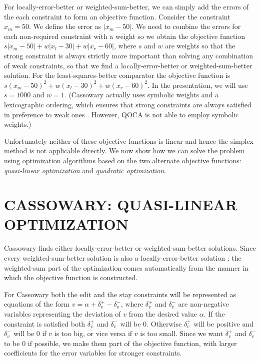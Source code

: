 \documentclass{uist96}
\begin{document}
For locally-error-better or weighted-sum-better, we can
simply add the errors of the each constraint to form an objective function.
Consider the constraint $x_m = 50$.  We define the error as $|x_m-50|$\@.  We
need to combine the errors for each non-required constraint with a weight
so we obtain the objective function 
\mbox{$s |x_m - 50| + w |x_l - 30| + w |x_r - 60|$}, where 
$s$ and $w$ are weights so that the strong constraint is always
strictly more important than solving any combination of weak constraints,
so that we find a locally-error-better or weighted-sum-better solution.
For the least-squares-better comparator the objective function is 
$s (x_m - 50)^2 + w (x_l - 30)^2 + w (x_r - 60)^2$\@.  
In the presentation, we will use $s = 1000$ and $w = 1$.
(Cassowary actually uses symbolic weights
and a lexicographic ordering, which ensures that
strong constraints are always satisfied in preference to weak 
ones \cite{borning-simplex-tr}.  However,
QOCA is not able to employ symbolic weights.)


Unfortunately neither of these objective functions is linear and hence the
simplex method is not applicable directly.  We now show how we can 
solve the problem using optimization algorithms
based on the two alternate objective functions: \emph{quasi-linear
optimization} and \emph{quadratic optimization}.

\section{CASSOWARY: QUASI-LINEAR OPTIMIZATION}
\label{quasi-linear}

Cassowary finds either locally-error-better or weighted-sum-better
solutions.  Since every weighted-sum-better solution is also a
locally-error-better solution \cite{borning-lisp-symbolic-computation-92};
the weighted-sum part of the optimization comes automatically from the
manner in which the objective function is constructed.

For Cassowary
both the edit and the stay constraints will be represented as equations of
the form $v = \alpha + \delta_v^{+} - \delta_v^{-}$, 
where $\delta_v^{+}$ and $\delta_v^{-}$ are non-negative variables
representing the
deviation of $v$ from the desired value $\alpha$.  If the constraint is
satisfied both $\delta_v^{+}$ and $\delta_v^{-}$ will be 0.  
Otherwise $\delta_v^{+}$ will be
positive and $\delta_v^{-}$ will be 0 if $v$ is too big, 
or vice versa if $v$ is
too small.  
Since we want $\delta_v^{+}$ and $\delta_v^{-}$ to be 0 if
possible, we make them part of the objective function, with larger
coefficients for the error variables for stronger constraints.
\end{document}
